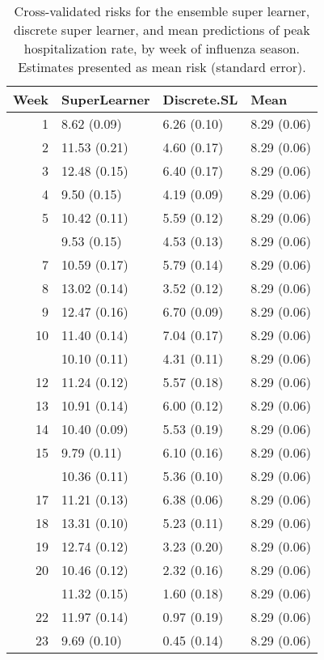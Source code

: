\documentclass[10pt,letterpaper]{article}
\begin{document}
\begin{table}

\caption{\label{tab:peakrate-risk-table}Cross-validated risks for the ensemble super learner, discrete super learner, and mean predictions of peak hospitalization rate, by week of influenza season. Estimates presented as mean risk (standard error).}
\centering
\begin{threeparttable}
\begin{tabular}[t]{rlll}
\toprule
Week & SuperLearner & Discrete.SL & Mean\\
\midrule
1 & 8.62 (0.09) & 6.26 (0.10) & 8.29 (0.06)\\
2 & 11.53 (0.21) & 4.60 (0.17) & 8.29 (0.06)\\
3 & 12.48 (0.15) & 6.40 (0.17) & 8.29 (0.06)\\
4 & 9.50 (0.15) & 4.19 (0.09) & 8.29 (0.06)\\
5 & 10.42 (0.11) & 5.59 (0.12) & 8.29 (0.06)\\
\addlinespace
6 & 9.53 (0.15) & 4.53 (0.13) & 8.29 (0.06)\\
7 & 10.59 (0.17) & 5.79 (0.14) & 8.29 (0.06)\\
8 & 13.02 (0.14) & 3.52 (0.12) & 8.29 (0.06)\\
9 & 12.47 (0.16) & 6.70 (0.09) & 8.29 (0.06)\\
10 & 11.40 (0.14) & 7.04 (0.17) & 8.29 (0.06)\\
\addlinespace
11 & 10.10 (0.11) & 4.31 (0.11) & 8.29 (0.06)\\
12 & 11.24 (0.12) & 5.57 (0.18) & 8.29 (0.06)\\
13 & 10.91 (0.14) & 6.00 (0.12) & 8.29 (0.06)\\
14 & 10.40 (0.09) & 5.53 (0.19) & 8.29 (0.06)\\
15 & 9.79 (0.11) & 6.10 (0.16) & 8.29 (0.06)\\
\addlinespace
16 & 10.36 (0.11) & 5.36 (0.10) & 8.29 (0.06)\\
17 & 11.21 (0.13) & 6.38 (0.06) & 8.29 (0.06)\\
18 & 13.31 (0.10) & 5.23 (0.11) & 8.29 (0.06)\\
19 & 12.74 (0.12) & 3.23 (0.20) & 8.29 (0.06)\\
20 & 10.46 (0.12) & 2.32 (0.16) & 8.29 (0.06)\\
\addlinespace
21 & 11.32 (0.15) & 1.60 (0.18) & 8.29 (0.06)\\
22 & 11.97 (0.14) & 0.97 (0.19) & 8.29 (0.06)\\
23 & 9.69 (0.10) & 0.45 (0.14) & 8.29 (0.06)\\

\end{tabular}
\end{threeparttable}
\end{table}
\end{document}
